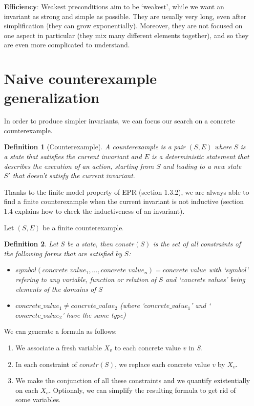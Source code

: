 \documentclass[11pt,a4paper,oldfontcommands,openany]{memoir}
\newtheorem*{definition}{Definition}
\begin{document}
    \textbf{Efficiency}: Weakest preconditions aim to be `weakest', while we want an invariant as strong and simple as possible.
    They are usually very long, even after simplification (they can grow exponentially).
    Moreover, they are not focused on one aspect in particular (they mix many different elements together), and so they are even more complicated
    to understand. 

    \section{Naive counterexample generalization}

    In order to produce simpler invariants, we can focus our search on a concrete counterexample.

    \begin{definition}[Counterexample]
    A counterexample is a pair \( (S,E) \) where \(S\) is a state that satisfies the current invariant and \(E\) is a deterministic statement that describes the execution of an action,
    starting from \(S\) and leading to a new state \(S'\) that doesn't satisfy the current invariant.
    \end{definition}
    Thanks to the finite model property of EPR (section 1.3.2), we are always able to find a finite counterexample when the current invariant is not inductive
    (section 1.4 explains how to check the inductiveness of an invariant).

    Let \( (S,E) \) be a finite counterexample.

    \begin{definition}
        Let \(S\) be a state, then \(constr(S)\) is the set of all constraints of the following forms that are satisfied by \(S\):
        \begin{itemize}
            \item \(symbol(concrete\_value_1,\ldots,concrete\_value_n) = concrete\_value\) with `\(symbol\)' refering to any variable, function or relation of \(S\) and `concrete values'
            being elements of the domains of \(S\)
            \item \(concrete\_value_1 \neq concrete\_value_2\) (where `\(concrete\_value_1\)' and `\(concrete\_value_2\)' have the same type)
        \end{itemize}
    \end{definition}

    We can generate a formula as follows:
    \begin{enumerate}
        \item We associate a fresh variable \( X_v \) to each concrete value \(v\) in \(S\).
        \item In each constraint of \(constr(S)\), we replace each concrete value \(v\) by \( X_v \).
        \item We make the conjunction of all these constraints and we quantify existentially on each \(X_v\). Optionaly, we can simplify the resulting formula to get rid of some variables.
    \end{enumerate}
    
\end{document}
